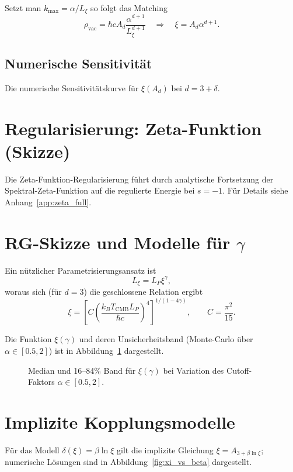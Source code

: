 	Setzt man $k_{\max}=\alpha/L_\xi$ so folgt das Matching
	\begin{equation}
		\rho_{\mathrm{vac}} = \hbar c  A_d  \frac{\alpha^{d+1}}{L_\xi^{d+1}}
		\quad\Rightarrow\quad
		\xi = A_d \alpha^{d+1}.
	\end{equation}
	
	\subsection{Numerische Sensitivität}
	Die numerische Sensitivitätskurve für $\xi(A_d)$ bei $d=3+\delta$.
	
	\section{Regularisierung: Zeta-Funktion (Skizze)}
	Die Zeta-Funktion-Regularisierung führt durch analytische Fortsetzung der Spektral-Zeta-Funktion auf die regulierte Energie bei $s=-1$. Für Details siehe Anhang~\ref{app:zeta_full}.
	
	\section{RG-Skizze und Modelle für $\gamma$}
	Ein nützlicher Parametrisierungsansatz ist
	\begin{equation}
		L_\xi = L_P\xi^{\gamma},
	\end{equation}
	woraus sich (für $d=3$) die geschlossene Relation ergibt
	\begin{equation}
		\xi = \left[ C \left(\frac{k_B T_{\mathrm{CMB}} L_P}{\hbar c}\right)^4 \right]^{1/(1-4\gamma)},\qquad C=\frac{\pi^2}{15}.
	\end{equation}
	
	Die Funktion $\xi(\gamma)$ und deren Unsicherheitsband (Monte-Carlo über $\alpha\in[0.5,2]$) ist in Abbildung~\ref{fig:xi_gamma_mc} dargestellt.
	
	\begin{figure}[htbp]
		\centering

		\caption{Median und 16--84\% Band für $\xi(\gamma)$ bei Variation des Cutoff-Faktors $\alpha\in[0.5,2]$.}
		\label{fig:xi_gamma_mc}
	\end{figure}
	
	\section{Implizite Kopplungsmodelle}
	Für das Modell $\delta(\xi)=\beta\ln\xi$ gilt die implizite Gleichung $\xi=A_{3+\beta\ln\xi}$; numerische Lösungen sind in Abbildung~\ref{fig:xi_vs_beta} dargestellt.
	
